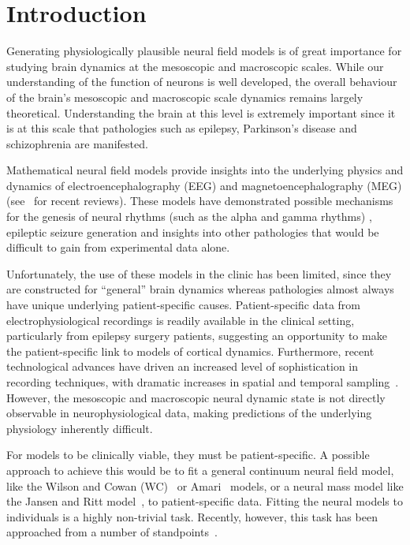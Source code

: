 \documentclass[12pt]{iopart}
\begin{document}
\maketitle

\section{Introduction}
Generating physiologically plausible neural field models is of great importance for studying brain dynamics at the mesoscopic and macroscopic scales. While our understanding of the function of neurons is well developed, the overall behaviour of the brain's mesoscopic and macroscopic scale dynamics remains largely theoretical. Understanding the brain at this level is extremely important since it is at this scale that pathologies such as epilepsy, Parkinson's disease and schizophrenia are manifested. 

Mathematical neural field models provide insights into the underlying physics and dynamics of electroencephalography (EEG) and magnetoencephalography (MEG) (see~\cite{Deco2008,David2003} for recent reviews). These models have demonstrated possible mechanisms for the genesis of neural rhythms (such as the alpha and gamma rhythms) \cite{Liley1999,RENNIE2000}, epileptic seizure generation \cite{DaSilva2003,Suffczynski2004,Wendling2005} and insights into other pathologies \cite{Moran2008,Schiff2009} that would be difficult to gain from experimental data alone. 

Unfortunately, the use of these models in the clinic has been limited, since they are constructed for ``general'' brain dynamics whereas pathologies almost always have unique underlying patient-specific causes. Patient-specific data from electrophysiological recordings is readily available in the clinical setting, particularly from epilepsy surgery patients, suggesting an opportunity to make the patient-specific link to models of cortical dynamics. Furthermore, recent technological advances have driven an increased level of sophistication in recording techniques, with dramatic increases in spatial and temporal sampling~\cite{Brinkmann2009}. However, the mesoscopic and macroscopic neural dynamic state is not directly observable in neurophysiological data, making predictions of the underlying physiology inherently difficult.

For models to be clinically viable, they must be patient-specific. A possible approach to achieve this would be to fit a general continuum neural field model, like the Wilson and Cowan (WC)~\cite{Wilson1973} or Amari~\cite{Amari1977} models, or a neural mass model like the Jansen and Ritt model~\cite{Jansen1995}, to patient-specific data. Fitting the neural models to individuals is a highly non-trivial task. Recently, however, this task has been approached from a number of standpoints~\cite{Nunez2000,Jirsa2002,Robinson2004,Daunizeau2009}.
\end{document}
